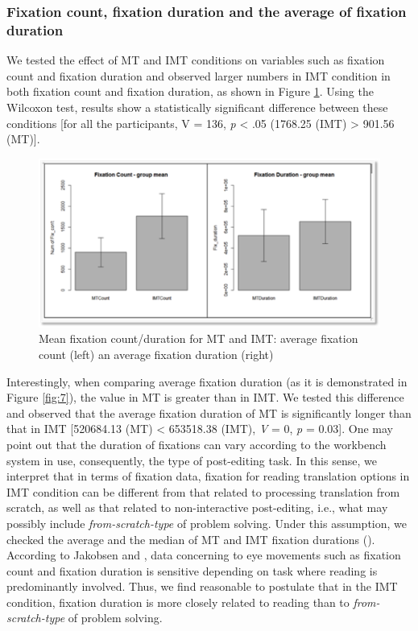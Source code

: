 \documentclass[output=paper]{langsci/langscibook}
\begin{document}
\subsubsection{Fixation count, fixation duration and the average of fixation duration}

We tested the effect of MT and IMT conditions on variables such as fixation count and fixation duration and observed larger numbers in IMT condition in both fixation count and fixation duration, as shown in Figure \ref{fig:6}. Using the Wilcoxon test, results show a statistically significant difference between these conditions [for all the participants, V = 136, \textit{p} {\textless} .05 (1768.25 (IMT) {\textgreater} 901.56 (MT)].


\begin{figure}
 \includegraphics[width=\textwidth]{figures/Sarto6.png}
 \caption{Mean fixation count/duration for MT and IMT: average fixation count (left) an average fixation duration (right)}
 \label{fig:6}
\end{figure} 



Interestingly, when comparing average fixation duration (as it is demonstrated in Figure \ref{fig:7}), the value in MT is greater than in IMT. We tested this difference and observed that the average fixation duration of MT is significantly longer than that in IMT [520684.13 (MT) {\textless} 653518.38 (IMT), \textit{V} = 0, \textit{p} = 0.03]. One may point out that the duration of fixations can vary according to the workbench system in use, consequently, the type of post-editing task. In this sense, we interpret that in terms of fixation data, fixation for reading translation options in IMT condition can be different from that related to processing translation from scratch, as well as that related to non-interactive post-editing, i.e., what may possibly include \textit{from-scratch-type} of problem solving. Under this assumption, we checked the average and the median of MT and IMT fixation durations (). According to Jakobsen and \citet{Jensen2008}, data concerning to eye movements such as fixation count and fixation duration is sensitive depending on task where reading is predominantly involved. Thus, we find reasonable to postulate that in the IMT condition, fixation duration is more closely related to reading than to \textit{from-scratch-type} of problem solving. 
\end{document}
